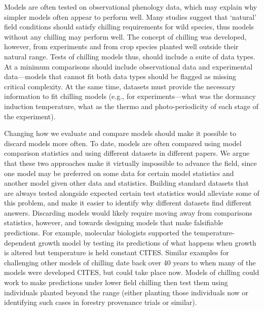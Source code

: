 \documentclass[11pt]{article}
\begin{document}
Models are often tested on observational phenology data, which may explain why simpler models often appear to perform well. Many studies suggest that `natural' field conditions should satisfy chilling requirements for wild species, thus models without any chilling may perform well. The concept of chilling was developed, however, from experiments and from crop species planted well outside their natural range. Tests of chilling models thus, should include a suite of data types. At a minimum comparisons should include observational data and experimental data---models that cannot fit both data types should be flagged as missing critical complexity.  At the same time, datasets must provide the necessary information to fit chilling models (e.g., for experiments---what was the dormancy induction temperature, what as the thermo and photo-periodicity of each stage of the experiment). 

Changing how we evaluate and compare models should make it possible to discard models more often. To date, models are often compared using model comparison statistics and using different datasets in different papers. We argue that these two approaches make it virtually impossible to advance the field, since one model may be preferred on some data for certain model statistics and another model given other data and statistics. Building standard datasets that are always tested alongside expected certain test statistics would alleviate some of this problem, and make it easier to identify why different datasets find different answers. Discarding models would likely require moving away from comparisons statistics, however, and towards designing models that make falsifiable predictions. For example, molecular biologists supported the temperature-dependent growth model by testing its predictions of what happens when growth is altered but temperature is held constant CITES. Similar examples for challenging other models of chilling date back over 40 years to when many of the models were developed CITES, but could take place now. Models of chilling could work to make predictions under lower field chilling then test them using individuals planted beyond the range (either planting those individuals now or identifying such cases in forestry provenance trials or similar). 
\end{document}
